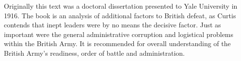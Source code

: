Originally this text was a doctoral dissertation presented to Yale University in
1916. The book is an analysis of additional factors to British defeat, as Curtis
contends that inept leaders were by no means the decisive factor. Just as
important were the general administrative corruption and logistical problems
within the British Army. It is recommended for overall understanding of the
British Army's readiness, order of battle and administration.
